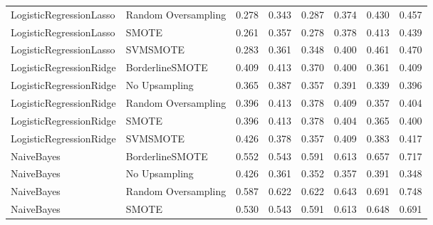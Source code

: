 \begin{tabular}{llllllll}
     LogisticRegressionLasso & Random Oversampling & 0.278 &                     0.343 &                 0.287 &                  0.374 &                                   0.430 &     0.457 \\
     LogisticRegressionLasso &               SMOTE & 0.261 &                     0.357 &                 0.278 &                  0.378 &                                   0.413 &     0.439 \\
     LogisticRegressionLasso &            SVMSMOTE & 0.283 &                     0.361 &                 0.348 &                  0.400 &                                   0.461 &     0.470 \\
     LogisticRegressionRidge &     BorderlineSMOTE & 0.409 &                     0.413 &                 0.370 &                  0.400 &                                   0.361 &     0.409 \\
     LogisticRegressionRidge &       No Upsampling & 0.365 &                     0.387 &                 0.357 &                  0.391 &                                   0.339 &     0.396 \\
     LogisticRegressionRidge & Random Oversampling & 0.396 &                     0.413 &                 0.378 &                  0.409 &                                   0.357 &     0.404 \\
     LogisticRegressionRidge &               SMOTE & 0.396 &                     0.413 &                 0.378 &                  0.404 &                                   0.365 &     0.400 \\
     LogisticRegressionRidge &            SVMSMOTE & 0.426 &                     0.378 &                 0.357 &                  0.409 &                                   0.383 &     0.417 \\
                  NaiveBayes &     BorderlineSMOTE & 0.552 &                     0.543 &                 0.591 &                  0.613 &                                   0.657 &     0.717 \\
                  NaiveBayes &       No Upsampling & 0.426 &                     0.361 &                 0.352 &                  0.357 &                                   0.391 &     0.348 \\
                  NaiveBayes & Random Oversampling & 0.587 &                     0.622 &                 0.622 &                  0.643 &                                   0.691 &     0.748 \\
                  NaiveBayes &               SMOTE & 0.530 &                     0.543 &                 0.591 &                  0.613 &                                   0.648 &     0.691 \\

\end{tabular}
